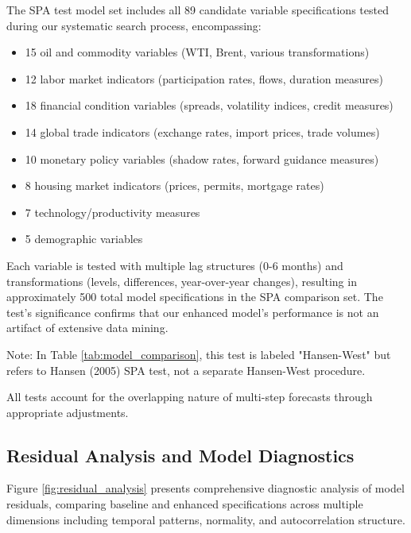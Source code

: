 \documentclass[12pt]{article}
\begin{document}
\begin{enumerate}
The SPA test model set includes all 89 candidate variable specifications tested during our systematic search process, encompassing:
\begin{itemize}
\item 15 oil and commodity variables (WTI, Brent, various transformations)
\item 12 labor market indicators (participation rates, flows, duration measures)
\item 18 financial condition variables (spreads, volatility indices, credit measures)
\item 14 global trade indicators (exchange rates, import prices, trade volumes)
\item 10 monetary policy variables (shadow rates, forward guidance measures)
\item 8 housing market indicators (prices, permits, mortgage rates)
\item 7 technology/productivity measures
\item 5 demographic variables
\end{itemize}
Each variable is tested with multiple lag structures (0-6 months) and transformations (levels, differences, year-over-year changes), resulting in approximately 500 total model specifications in the SPA comparison set. The test's significance confirms that our enhanced model's performance is not an artifact of extensive data mining.

Note: In Table \ref{tab:model_comparison}, this test is labeled "Hansen-West" but refers to Hansen (2005) SPA test, not a separate Hansen-West procedure.
\end{enumerate}

All tests account for the overlapping nature of multi-step forecasts through appropriate adjustments.

\subsection{Residual Analysis and Model Diagnostics}

Figure \ref{fig:residual_analysis} presents comprehensive diagnostic analysis of model residuals, comparing baseline and enhanced specifications across multiple dimensions including temporal patterns, normality, and autocorrelation structure.
\end{document}
